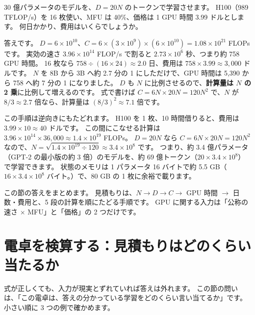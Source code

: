 \begin{quiz}
30 億パラメータのモデルを、$D=20N$ のトークンで学習させます。
H100（989 TFLOP/s）を 16 枚使い、MFU は 40\%、価格は 1 GPU 時間 3.99 ドルとします。
何日かかり、費用はいくらでしょうか。
\end{quiz}

答えです。
$D=6\times10^{10}$、$C=6\times(3\times10^{9})\times(6\times10^{10})=1.08\times10^{21}$ FLOPs です。
実効の速さ $3.96\times10^{14}$ FLOP/s で割ると $2.73\times10^{6}$ 秒、つまり約 758 GPU 時間。
16 枚なら $758\div(16\times24)\approx2.0$ 日、費用は $758\times3.99\approx3{,}000$ ドルです。
$N$ を 8B から 3B へ約 2.7 分の 1 にしただけで、GPU 時間は 5,390 から 758 へ約 7 分の 1 になりました。
$D$ も $N$ に比例させるので、\textbf{計算量は $N$ の 2 乗}に比例して増えるのです。
式で書けば $C=6N\times20N=120N^{2}$ で、$N$ が $8/3\approx2.7$ 倍なら、計算量は $(8/3)^{2}\approx7.1$ 倍です。

\begin{example}
この手順は逆向きにもたどれます。
H100 を 1 枚、10 時間借りると、費用は $3.99\times10\approx40$ ドルです。
この間にこなせる計算は $3.96\times10^{14}\times36{,}000\approx1.4\times10^{19}$ FLOPs。
$D=20N$ なら $C=6N\times20N=120N^{2}$ なので、$N=\sqrt{1.4\times10^{19}\div120}\approx3.4\times10^{8}$ です。
つまり、約 3.4 億パラメータ（GPT-2 の最小版の約 3 倍）のモデルを、約 69 億トークン（$20\times3.4\times10^{8}$）で学習できます。
状態のメモリは 1 パラメータ 16 バイトで約 5.5 GB（$16\times3.4\times10^{8}$ バイト。）で、80 GB の 1 枚に余裕で載ります。
\end{example}

この節の答えをまとめます。
見積もりは、$N \to D \to C \to$ GPU 時間 $\to$ 日数・費用と、5 段の計算を順にたどる手順です。
GPU に関する入力は「公称の速さ $\times$ MFU」と「価格」の 2 つだけです。

\section{電卓を検算する：見積もりはどのくらい当たるか}\label{sec:infra-verify}

式が正しくても、入力が現実とずれていれば答えは外れます。
この節の問いは、「この電卓は、答えの分かっている学習をどのくらい言い当てるか」です。
小さい順に 3 つの例で確かめます。

